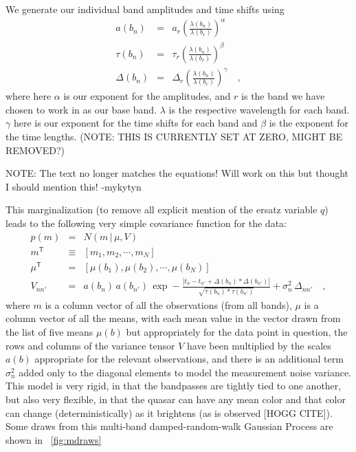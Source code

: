 \documentclass[letterpaper,12pt,preprint]{aastex}
\newcommand{\given}{\,|\,}
\newcommand{\transpose}[1]{{#1}^{\mathsf{T}}}
\begin{document}
We generate our individual band amplitudes and time shifts using
\begin{eqnarray}
a(b_n) &=& a_r(\frac{\lambda(b_n)}{\lambda(b_r)})^\alpha
\\
\tau(b_n) &=& \tau_r(\frac{\lambda(b_n)}{\lambda(b_r)})^\beta
\\
\Delta(b_n) &=& \Delta_r(\frac{\lambda(b_n)}{\lambda(b_r)})^\gamma
\quad ,
\end{eqnarray}
where here $\alpha$ is our exponent for the amplitudes, and $r$ is the band we have chosen to work in as our base band. $\lambda$ is the respective wavelength for each band. $\gamma$ here is our exponent for the time shifts for each band and $\beta$ is the exponent for the time lengths. (NOTE: THIS IS CURRENTLY SET AT ZERO, MIGHT BE REMOVED?)


NOTE: The text no longer matches the equations! Will work on this but thought I should mention this! -mykytyn

This marginalization (to remove all explicit mention of the ersatz
variable $q$) leads to the following very simple covariance function
for the data:
\begin{eqnarray}
p(m) &=& N(m\given \mu,V)
\label{eq:likestart}
\\
\transpose{m} &\equiv& [m_1, m_2, \cdots , m_N]
\\
\transpose{\mu} &=& [\mu(b_1), \mu(b_2), \cdots , \mu(b_N)]
\\
V_{nn'} &=& a(b_n)\,a(b_{n'})\,\exp -\frac{|t_n - t_{n'}+\Delta(b_n)*\Delta(b_{n'})|}{\sqrt{\tau(b_n)*\tau(b_{n'})}} + \sigma_n^2\,\Delta_{nn'}
\label{eq:likeend}
\quad ,
\end{eqnarray}
where $m$ is a column vector of all the observations (from all bands),
$\mu$ is a column vector of all the means, with each mean value in the
vector drawn from the list of five means $\mu(b)$ but appropriately
for the data point in question, the rows and columns of the variance
tensor $V$ have been multiplied by the scales $a(b)$ appropriate for
the relevant observations, and there is an additional term
$\sigma_n^2$ added only to the diagonal elements to model the
measurement noise variance.  This model is very rigid, in that the
bandpasses are tightly tied to one another, but also very flexible, in
that the quasar can have any mean color and that color can change
(deterministically) as it brightens (as is observed [HOGG CITE]).
Some draws from this multi-band damped-random-walk Gaussian Process
are shown in \figurename~\ref{fig:mdraws}
\end{document}
